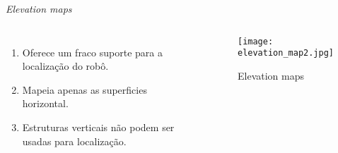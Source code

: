 \begin{frame}[t]{\textit{Elevation maps}} 
    \transdissolve[duration=0.5]    
        \begin{columns}[t]
                \begin{enumerate}
                    \item Oferece um fraco suporte para a localização do robô.
                    \item Mapeia apenas as superficies horizontal.
                    \item Estruturas verticais não podem ser usadas para localização.
                \end{enumerate}
            \begin{center}
                \begin{figure}
                    \texttt{[image: elevation\_map2.jpg]}
                    \caption{Elevation maps \cite{article}}
                \end{figure}
            \end{center}
        \end{columns}
\end{frame}

